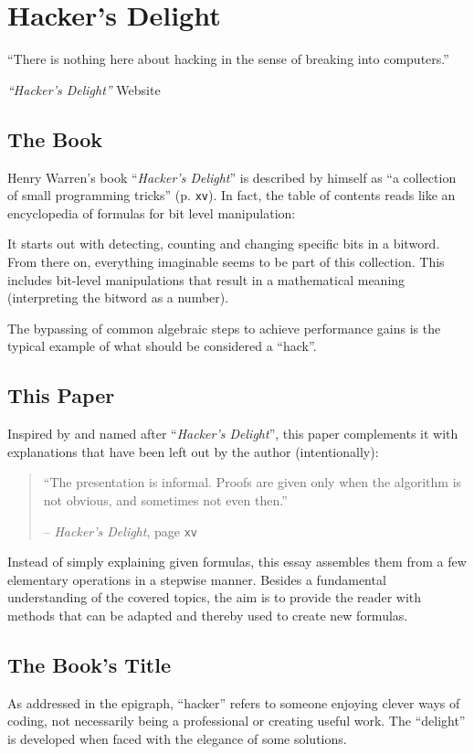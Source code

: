 \section{Hacker's Delight}\label{sec:book}
\epigraph{
``There is nothing here about hacking
in the sense of breaking into computers.''
}{
\emph{``Hacker's Delight''} Website
\cite{Warren:HD:Website}
}


\subsection*{The Book}
Henry Warren's book ``\emph{Hacker's Delight}''
is described by himself as
``a collection of small programming tricks''
\cite{Warren:2012:HD:2462741} (p. \texttt{xv}).
In fact, the table of contents reads like
an encyclopedia of formulas for bit level manipulation:

It starts out with detecting, counting and changing
specific bits in a bitword.
From there on, everything imaginable seems to be part of this collection.
This includes bit-level manipulations that result
in a mathematical meaning (interpreting the bitword as a number).

The bypassing of common algebraic steps
to achieve performance gains is the typical example
of what should be considered a ``hack''.


\subsection*{This Paper}
Inspired by and named after ``\emph{Hacker's Delight}'',
this paper complements it with explanations
that have been left out by the author (intentionally):

\begin{quote}
``The presentation is informal.
Proofs are given only when the algorithm is not obvious,
and sometimes not even then.''
\par\hfill -- \emph{Hacker's Delight},
page \texttt{xv} \cite{Warren:2012:HD:2462741}
\end{quote}

Instead of simply explaining given formulas,
this essay assembles them from a few elementary operations
in a stepwise manner.
Besides a fundamental understanding of the covered topics,
the aim is to provide the reader with methods
that can be adapted and thereby used to create new formulas.


\subsection*{The Book's Title}
As addressed in the epigraph, ``hacker'' refers to
someone enjoying clever ways of coding,
not necessarily being a professional
or creating useful work.
The ``delight'' is developed when faced with the elegance of some solutions.
